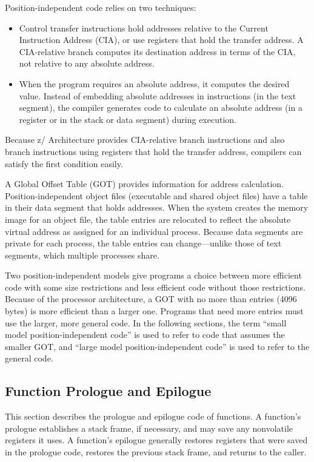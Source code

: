 \documentclass[english,11pt,twoside,toc=bib,toc=idx]{scrreprt}
\newcommand{\ARCH}{z/\kern-1pt Ar\-chi\-tec\-ture}
\newcommand{\ARCHarch}{\ARCH}
\newcommand{\ARCH}{ESA/390}
\newcommand{\ARCHarch}{the \ARCH{} ar\-chi\-tec\-ture}
\begin{document}
Position-independent code relies on two techniques:
\begin{itemize}
\item Control transfer instructions hold addresses relative to the
  Current Instruction Address (CIA), or use registers that hold the
  transfer address.  A CIA-relative branch computes its destination
  address in terms of the CIA, not relative to any absolute address.
\item When the program requires an absolute address, it computes the
  desired value.  Instead of embedding absolute addresses in
  instructions (in the text segment), the compiler generates code to
  calculate an absolute address (in a register or in the stack or data
  segment) during execution.
\end{itemize}

Because \ARCHarch{}
provides CIA-relative branch instructions and also branch instructions
using registers that hold the transfer address, compilers can satisfy
the first condition easily.

A Global Offset Table (GOT) provides information for address
calculation.  Position-independent object files (executable and shared
object files) have a table in their data segment that holds
addresses.  When the system creates the memory image for an object
file, the table entries are relocated to reflect the absolute virtual
address as assigned for an individual process.  Because data segments
are private for each process, the table entries can change---unlike
those of text segments, which multiple processes share.

Two position-independent models give programs a choice between more
efficient code with some size restrictions and less efficient code
without those restrictions.  Because of the processor architecture, a
GOT with no more than {\fi} entries (4096
bytes) is more efficient than a larger one.  Programs that need more
entries must use the larger, more general code.  In the following
sections, the term ``small model position-independent code'' is used
to refer to code that assumes the smaller GOT, and ``large model
position-independent code'' is used to refer to the general code.

\subsection{Function Prologue and Epilogue}
This section describes the prologue and epilogue code of functions.  A
function's prologue establishes a stack frame, if necessary, and may
save any nonvolatile registers it uses.  A function's epilogue generally
restores registers that were saved in the prologue code, restores the
previous stack frame, and returns to the caller.
\end{document}
